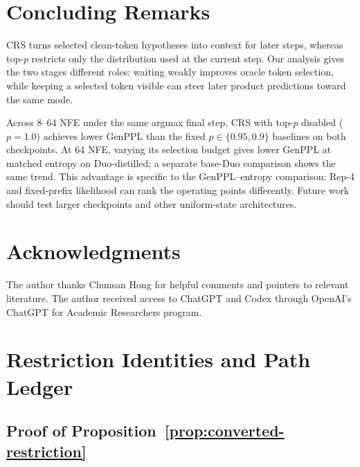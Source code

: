 \documentclass{article}
\newcommand{\1}{\mathbf 1}
\newcommand{\CRS}{\textsc{CRS}}
\theoremstyle{definition}
\begin{document}
\section{Concluding Remarks}
\label{sec:conclusion}

\CRS{} turns selected clean-token hypotheses into context for later steps,
whereas top-$p$ restricts only the distribution used at the current step. Our
analysis gives the two stages different roles: waiting weakly improves oracle
token selection, while keeping a selected token visible can steer later
product predictions toward the same mode.

Across 8--64 NFE under the same argmax final step, \CRS{} with top-$p$
disabled ($p=1.0$) achieves lower GenPPL than the fixed
$p\in\{0.95,0.9\}$ baselines on both checkpoints. At 64 NFE, varying its
selection budget gives lower GenPPL at matched entropy on Duo-distilled; a
separate base-Duo comparison shows the same trend. This advantage is specific
to the GenPPL--entropy comparison: Rep-4 and fixed-prefix likelihood can rank
the operating points differently. Future work should test larger checkpoints
and other uniform-state architectures.


\section*{Acknowledgments}
The author thanks Chunsan Hong for helpful comments and pointers to relevant literature.
The author received access to ChatGPT and Codex through OpenAI's
ChatGPT for Academic Researchers program.

\clearpage



\clearpage
\appendix
\iffalse
\section{Restriction Identities and Path Ledger}
\label{app:path-ledger}

\subsection{Proof of Proposition~\ref{prop:converted-restriction}}
\end{document}
